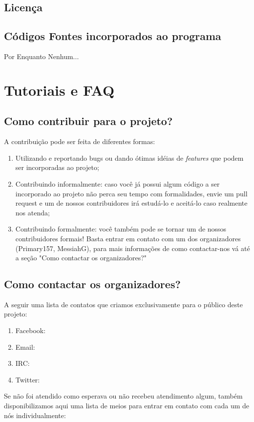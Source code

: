 \documentclass[a4paper,12pt]{article}
\begin{document}
		\subsection{Licença} 
		
		\subsection{Códigos Fontes incorporados ao programa}
		
		Por Enquanto Nenhum...
		
	\section{Tutoriais e FAQ}
		\subsection{Como contribuir para o projeto?}
		A contribuição pode ser feita de diferentes formas:
		\begin{enumerate}
			\item Utilizando e reportando bugs ou dando ótimas idéias de \textit{features} que podem ser incorporadas ao projeto;
			\item Contribuindo informalmente: caso você já possui algum código a ser incorporado ao projeto não perca seu tempo com formalidades, envie um pull request e um de nossos contribuidores irá estudá-lo e aceitá-lo caso realmente nos atenda;
			\item Contribuindo formalmente: você também pode se tornar um de nossos contribuidores formais! Basta entrar em contato com um dos organizadores (Primary157, MessiahG), para mais informações de como contactar-nos vá até a seção "Como contactar os organizadores?"
		\end{enumerate}
		\subsection{Como contactar os organizadores?}
		A seguir uma lista de contatos que criamos exclusivamente para o público deste projeto:
		 \begin{enumerate}
		 	\item Facebook:
		 	\item Email:
		 	\item IRC:
		 	\item Twitter:
		 \end{enumerate}
		Se não foi atendido como esperava ou não recebeu atendimento algum, também disponibilizamos aqui uma lista de meios para entrar em contato com cada um de nós individualmente:
\end{document}
